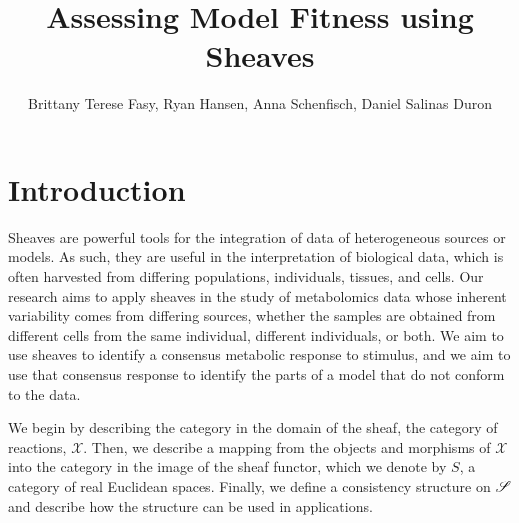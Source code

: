 \documentclass{article}
\title{Assessing Model Fitness using Sheaves}
\author{Brittany Terese Fasy, Ryan Hansen, Anna Schenfisch, Daniel Salinas
Duron}
\begin{document}
\maketitle



\section{Introduction}


Sheaves are powerful tools for the integration of data of heterogeneous sources
or models\cite{robinson2017sheaves}. As such, they are useful in the
interpretation of biological data, which is often harvested from differing
populations, individuals, tissues, and cells. Our research aims to apply
sheaves in the study of metabolomics data whose inherent variability comes from
differing sources, whether the samples are obtained from different cells from
the same individual, different individuals, or both. We aim to use sheaves to
identify a consensus metabolic response to stimulus, and we aim to use that
consensus response to identify the parts of a model that do not conform to the
data.

We begin by describing the category in the domain of the sheaf, the category of
reactions, $\mathcal{X}$.  Then, we describe a mapping from the objects and
morphisms of $\mathcal{X}$ into the category in the image of the sheaf functor,
which we denote by $S$, a category of real Euclidean spaces. Finally, we define
a consistency structure on $\mathscr{S}$ and describe how the structure can be used
in applications.
\end{document}
